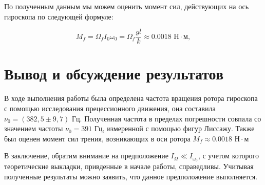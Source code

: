 \documentclass[12pt]{article}
\begin{document}
По полученным данным мы можем оценить момент сил, действующих на ось гироскопа по следующей формуле:

\begin{equation}
M_f = \Omega_f I_0\omega_0 = \Omega_f \frac{gl}{k} \approx 0.0018 \text{ Н} \cdot \text{м},
\end{equation}

\section*{Вывод и обсуждение результатов}

В ходе выполнения работы была определена частота вращения ротора гироскопа с помощью исследования прецессионного движения, она составила $\nu_0 = (382,5 \pm  9,7) \text{ Гц}$. Полученная частота в пределах погрешности совпала со значением частоты  $\nu_0 = 391 \text{ Гц}$, измеренной с помощью фигур Лиссажу. Также был оценен момент сил трения, возникающих в оси ротора $M_f \approx 0.0018 \text{ Н} \cdot \text{м}$

В заключение, обратим внимание на предположение $I_{\Omega} \ll I_{\omega_0}$,  с учетом которого теоретические выкладки, привденные в начале работы, справедливы. Учитывая полученные результаты можно заявить, что данное предположение выполняется.
\end{document}
